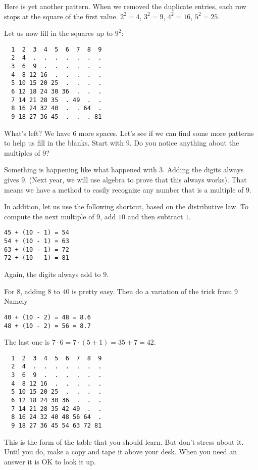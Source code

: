 \documentclass[11pt, oneside]{article}
\begin{document}
Here is yet another pattern.  When we removed the duplicate entries, each row stops at the square of the first value.  $2^2 = 4$, $3^2 = 9$, $4^2 = 16$, $5^2 = 25$.

Let us now fill in the squares up to $9^2$:

\newpage
\begin{verbatim}
  1  2  3  4  5  6  7  8  9
  2  4  .  .  .  .  .  .  .
  3  6  9  .  .  .  .  .  .
  4  8 12 16  .  .  .  .  .
  5 10 15 20 25  .  .  .  .
  6 12 18 24 30 36  .  .  .
  7 14 21 28 35  . 49  .  .
  8 16 24 32 40  .  . 64  .
  9 18 27 36 45  .  .  . 81
\end{verbatim}

What's left?  We have 6 more spaces.  Let's see if we can find some more patterns to help us fill in the blanks.  Start with $9$.  Do you notice anything about the multiples of $9$?  

Something is happening like what happened with $3$.  Adding the digits always gives $9$.  (Next year, we will use algebra to prove that this always works).  That means we have a method to easily recognize any number that is a multiple of $9$.

In addition, let us use the following shortcut, based on the distributive law.  To compute the next multiple of $9$, add $10$ and then subtract $1$.

\begin{verbatim}
45 + (10 - 1) = 54
54 + (10 - 1) = 63
63 + (10 - 1) = 72
72 + (10 - 1) = 81
\end{verbatim}

Again, the digits always add to $9$.

For $8$, adding $8$ to $40$ is pretty easy.  Then do a variation of the trick from $9$  Namely
\begin{verbatim}
40 + (10 - 2) = 48 = 8.6
48 + (10 - 2) = 56 = 8.7
\end{verbatim}

The last one is $7 \cdot 6 = 7 \cdot (5 + 1) = 35 + 7 = 42$.

\begin{verbatim}
  1  2  3  4  5  6  7  8  9
  2  4  .  .  .  .  .  .  .
  3  6  9  .  .  .  .  .  .
  4  8 12 16  .  .  .  .  .
  5 10 15 20 25  .  .  .  .
  6 12 18 24 30 36  .  .  .
  7 14 21 28 35 42 49  .  .
  8 16 24 32 40 48 56 64  .
  9 18 27 36 45 54 63 72 81
\end{verbatim}

This is the form of the table that you should learn.  But don't stress about it.  Until you do, make a copy and tape it above your desk.  When you need an answer it is OK to look it up.  
\end{document}

